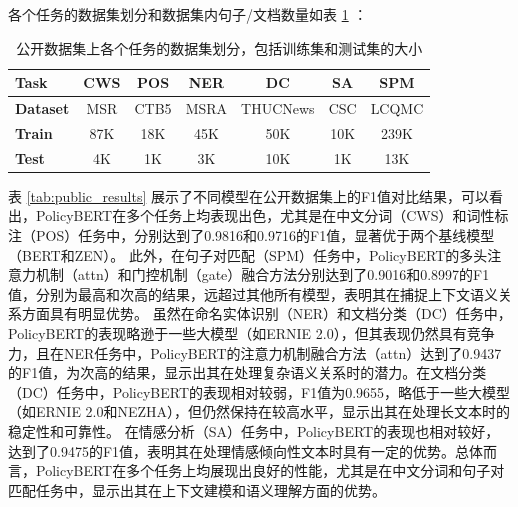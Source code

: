 \documentclass[12pt, a4paper]{ctexart}
\begin{document}
各个任务的数据集划分和数据集内句子/文档数量如表 \ref{tab:public_datasets} ：

\begin{table}[H]
    \renewcommand{\arraystretch}{1}
    \centering
    \caption{公开数据集上各个任务的数据集划分，包括训练集和测试集的大小}
    \begin{tabular}{l|cccccc}
        \toprule
        \textbf{Task} & CWS & POS & NER & DC & SA & SPM\\
        \midrule
        \textbf{Dataset} & MSR & CTB5 & MSRA & THUCNews & CSC & LCQMC\\
        \midrule
        \textbf{Train} & 87K & 18K & 45K & 50K & 10K & 239K \\
        \textbf{Test} & 4K & 1K & 3K & 10K & 1K & 13K \\
        \bottomrule
    \end{tabular}
    \label{tab:public_datasets}
\end{table}

表 \ref{tab:public_results} 展示了不同模型在公开数据集上的F1值对比结果，可以看出，PolicyBERT在多个任务上均表现出色，尤其是在中文分词（CWS）和词性标注（POS）任务中，分别达到了0.9816和0.9716的F1值，显著优于两个基线模型（BERT和ZEN）。
此外，在句子对匹配（SPM）任务中，PolicyBERT的多头注意力机制（attn）和门控机制（gate）融合方法分别达到了0.9016和0.8997的F1值，分别为最高和次高的结果，远超过其他所有模型，表明其在捕捉上下文语义关系方面具有明显优势。
虽然在命名实体识别（NER）和文档分类（DC）任务中，PolicyBERT的表现略逊于一些大模型（如ERNIE 2.0），但其表现仍然具有竞争力，且在NER任务中，PolicyBERT的注意力机制融合方法（attn）达到了0.9437的F1值，为次高的结果，显示出其在处理复杂语义关系时的潜力。在文档分类（DC）任务中，PolicyBERT的表现相对较弱，F1值为0.9655，略低于一些大模型（如ERNIE 2.0和NEZHA），但仍然保持在较高水平，显示出其在处理长文本时的稳定性和可靠性。
在情感分析（SA）任务中，PolicyBERT的表现也相对较好，达到了0.9475的F1值，表明其在处理情感倾向性文本时具有一定的优势。总体而言，PolicyBERT在多个任务上均展现出良好的性能，尤其是在中文分词和句子对匹配任务中，显示出其在上下文建模和语义理解方面的优势。
\end{document}
